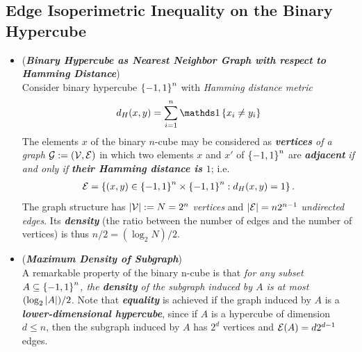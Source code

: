 \documentclass[11pt]{article}
\begin{document}
\subsection{Edge Isoperimetric Inequality on the Binary Hypercube}
\begin{itemize}
\item \begin{remark} (\textbf{\emph{Binary Hypercube as Nearest Neighbor Graph with respect to Hamming Distance}})\\
Consider binary hypercube $\left\{-1, 1\right\}^n$ with \emph{Hamming distance metric}
\begin{align*}
d_H(x, y) = \sum_{i=1}^{n}\ind{x_i \neq y_i} 
\end{align*} The elements $x$ of the binary $n$-cube may be considered as \emph{\textbf{vertices} of a graph ${\mathcal G} := ({\mathcal V}, {\mathcal E})$} in which two elements $x$ and $x'$ of  $\left\{-1, 1\right\}^n$ are \emph{\textbf{adjacent}} \emph{if and only if \textbf{their Hamming distance is $1$}}; i.e.
\begin{align*}
{\mathcal E} = \left\{(x,y) \in \left\{-1, 1\right\}^n \times \left\{-1, 1\right\}^n: d_H(x, y) = 1 \right\}.
\end{align*} The graph structure has $\left\lvert {\mathcal V} \right\rvert := N = 2^n$ \emph{vertices} and $\left\lvert {\mathcal E} \right\rvert = n2^{n-1}$ \emph{undirected edges}. Its \emph{\textbf{density}} (the ratio between the number of edges and the number of vertices) is thus $n/2 = (\log_2 N)/2$.
\end{remark}

\item \begin{remark} (\textbf{\emph{Maximum Density of Subgraph}})\\
A remarkable property of the binary n-cube is that \emph{for any subset $A \subseteq \left\{-1, 1\right\}^n$, the \textbf{density} of the subgraph induced by $A$ is at most $(\log_2 \left\lvert A \right\rvert)/2$}.  Note that \emph{\textbf{equality}} is achieved if the graph induced by $A$ is a \emph{\textbf{lower-dimensional hypercube}}, since if $A$ is a hypercube of dimension $d \le n$, then the subgraph induced by $A$ has $2^d$ vertices and ${\mathcal E}(A) = d2^{d-1}$ edges.
\end{remark}


\end{itemize}
\end{document}
